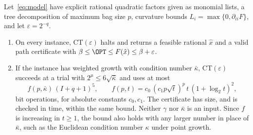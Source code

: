 \begin{theorem}\label{thm:approx}
Let~\eqref{eq:model} have explicit rational quadratic factors given as
monomial lists, a tree decomposition of maximum bag size $p$, curvature bounds
$L_i=\max\{0,\partial_{ii}F\}$, and let $\varepsilon=2^{-q}$.
\begin{enumerate}[label=(\alph*)]
\item On every instance, CT$(\varepsilon)$ halts and returns a feasible
rational $\hat x$ and a valid path certificate with
$\beta\le\OPT\le F(\hat x)\le\beta+\varepsilon$.
\item If the instance has weighted growth with condition number $\bar\kappa$,
CT$(\varepsilon)$ succeeds at a trial with $2^\mu\le6\sqrt{\bar\kappa}$ and
uses at most
\[
f(p,\bar\kappa)\,(I+q+1)^5,\qquad
f(p,t)=c_0\,(c_1p\sqrt t)^p\,t\,(1+\log_2t)^2,
\]
bit operations, for absolute constants $c_0,c_1$. The certificate has size,
and is checked in time, within the same bound. Neither $\gamma$ nor
$\bar\kappa$ is an input. Since $f$ is increasing in $t\ge1$, the bound also
holds with any larger number in place of $\bar\kappa$, such as the Euclidean
condition number $\kappa$ under point growth.
\end{enumerate}
\end{theorem}

